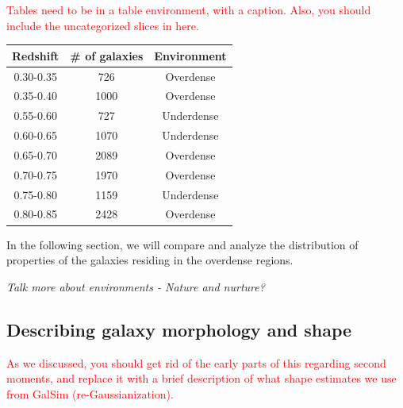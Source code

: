 \documentclass[twocolumn,useAMS,usenatbib]{mn2e}
\newcommand{\rachel}[1]{{\textcolor{red}{#1}}}
\begin{document}
\rachel{Tables need to be in a table environment, with a caption.
  Also, you should include the uncategorized slices in here.}
\begin{tabular}{c|c|c|}
 \hline
 Redshift & \# of galaxies & Environment \\
 \hline
 0.30-0.35 & 726 & Overdense \\
 0.35-0.40 & 1000 & Overdense \\
 0.55-0.60 & 727 & Underdense \\
 0.60-0.65 & 1070 & Underdense \\
 0.65-0.70 & 2089 & Overdense \\
 0.70-0.75 & 1970 & Overdense \\
 0.75-0.80 & 1159 & Underdense \\
 0.80-0.85 & 2428 & Overdense \\
 \hline
\end{tabular}

In the following section, we will compare and analyze the distribution of properties of the galaxies residing in the overdense regions.

\emph{Talk more about environments - Nature and nurture?}

\subsection{Describing galaxy morphology and shape}
\label{sub:axisratio}

\rachel{As we discussed, you should get rid of the early parts of this
  regarding second moments, and replace it with a brief description of
  what shape estimates we use from GalSim (re-Gaussianization).}
\end{document}
